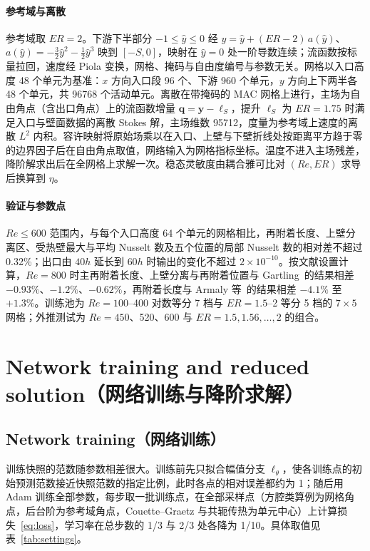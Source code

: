 \paragraph{参考域与离散}
参考域取 $ER=2$。下游下半部分 $-1\le\hat y\le0$ 经 $y=\hat y+(ER-2)\,a(\hat y)$、$a(\hat y)=-\tfrac32\hat y^2-\tfrac12\hat y^3$ 映到 $[-S,0]$，映射在 $\hat y=0$ 处一阶导数连续；流函数按标量拉回，速度经 Piola 变换，网格、掩码与自由度编号与参数无关。网格以入口高度 48 个单元为基准：$x$ 方向入口段 96 个、下游 960 个单元，$y$ 方向上下两半各 48 个单元，共 96768 个活动单元。离散在带掩码的 MAC 网格上进行，主场为自由角点（含出口角点）上的流函数增量 $\mathbf q=\mathbf y-\boldsymbol\ell_S$，提升 $\boldsymbol\ell_S$ 为 $ER=1.75$ 时满足入口与壁面数据的离散 Stokes 解，主场维数 95712，度量为参考域上速度的离散 $L^2$ 内积。容许映射将原始场乘以在入口、上壁与下壁折线处按距离平方趋于零的边界因子后在自由角点取值，网络输入为网格指标坐标。温度不进入主场残差，降阶解求出后在全网格上求解一次。稳态灵敏度由耦合雅可比对 $(Re,ER)$ 求导后换算到 $\eta$。

\paragraph{验证与参数点}
$Re\le600$ 范围内，与每个入口高度 64 个单元的网格相比，再附着长度、上壁分离区、受热壁最大与平均 Nusselt 数及五个位置的局部 Nusselt 数的相对差不超过 0.32\%；出口由 $40h$ 延长到 $60h$ 时输出的变化不超过 $2\times10^{-10}$。按文献设置计算，$Re=800$ 时主再附着长度、上壁分离与再附着位置与 Gartling~\cite{gartling1990test}的结果相差 $-0.93\%$、$-1.2\%$、$-0.62\%$，再附着长度与 Armaly 等~\cite{armaly1983experimental}的结果相差 $-4.1\%$ 至 $+1.3\%$。训练池为 $Re=100$--400 对数等分 7 档与 $ER=1.5$--2 等分 5 档的 $7\times5$ 网格；外推测试为 $Re=450$、520、600 与 $ER=1.5,1.56,\ldots,2$ 的组合。

\section{Network training and reduced solution（网络训练与降阶求解）}
\label{app:method}
\setcounter{table}{0}
\setcounter{figure}{0}

\subsection{Network training（网络训练）}
\label{app:training}

训练快照的范数随参数相差很大。训练前先只拟合幅值分支 $\ell_\theta$，使各训练点的初始预测范数接近快照范数的指定比例，此时各点的相对误差都约为 1；随后用 Adam 训练全部参数，每步取一批训练点，在全部采样点（方腔类算例为网格角点，后台阶为参考域角点，Couette--Graetz 与共轭传热为单元中心）上计算损失~\eqref{eq:loss}，学习率在总步数的 1/3 与 2/3 处各降为 1/10。具体取值见表~\ref{tab:settings}。

